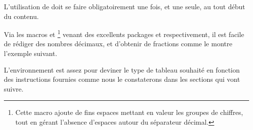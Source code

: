 \documentclass[10pt, a4paper]{article}
\begin{document}
\begin{tdocwarn}
	L'utilisation de  doit se faire obligatoirement une fois, et une seule, au tout début du contenu.
\end{tdocwarn}




\begin{tdocexa}
    \leavevmode

\end{tdocexa}




\begin{tdocexa}
    \leavevmode

\end{tdocexa}



\begin{tdoctip}
%
    Via les macros  et 
    \footnote{
    	Cette macro ajoute de fins espaces mettant en valeur les groupes de chiffres, tout en gérant l'absence d'espaces autour du séparateur décimal.
    }
    venant des excellents packages  et  respectivement, il est facile de rédiger des nombres décimaux, et d'obtenir de  fractions comme le montre l'exemple suivant.

\end{tdoctip}




\begin{tdocnote}
	L'environnement  est assez  pour deviner le type de tableau souhaité en fonction des instructions fournies comme nous le constaterons dans les sections qui vont suivre.
\end{tdocnote}
\end{document}
